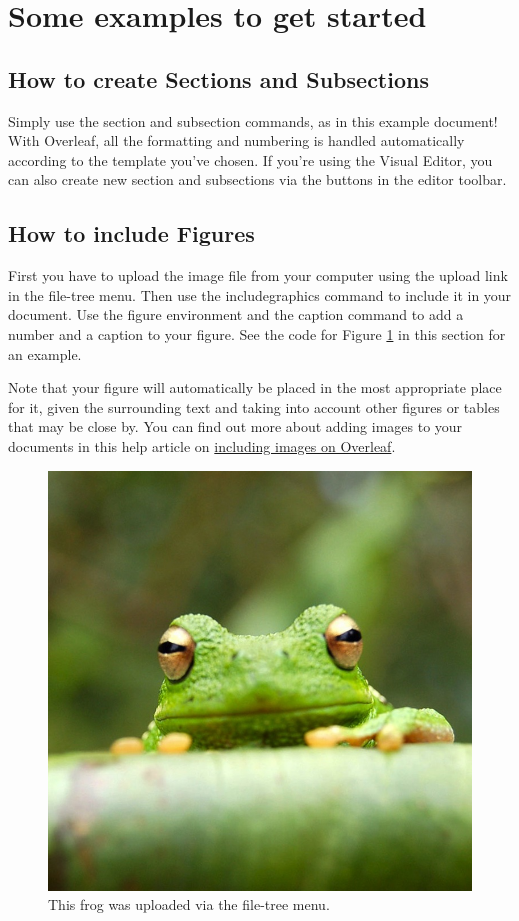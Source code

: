 \documentclass[twocolumn]{ltjsarticle}
\begin{document}
\section{Some examples to get started}

      \subsection{How to create Sections and Subsections}

            Simply use the section and subsection commands, as in this example document! With Overleaf, all the formatting and numbering is handled automatically according to the template you've chosen. If you're using the Visual Editor, you can also create new section and subsections via the buttons in the editor toolbar.

      \subsection{How to include Figures}

            First you have to upload the image file from your computer using the upload link in the file-tree menu. Then use the includegraphics command to include it in your document. Use the figure environment and the caption command to add a number and a caption to your figure. See the code for Figure \ref{fig:frog} in this section for an example.

            Note that your figure will automatically be placed in the most appropriate place for it, given the surrounding text and taking into account other figures or tables that may be close by. You can find out more about adding images to your documents in this help article on \href{https://www.overleaf.com/learn/how-to/Including_images_on_Overleaf}{including images on Overleaf}.

            \begin{figure}
                  \centering
                  \includegraphics[width=0.25\linewidth]{frog.jpg}
                  \caption{\label{fig:frog}This frog was uploaded via the file-tree menu.}
            \end{figure}
\end{document}
